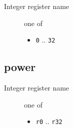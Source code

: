 \documentclass{article}
\begin{document}
\begin{description}
\item[Integer register name]  one of
  \begin{itemize}
  \item \verb|0| .. \verb|32|
  \end{itemize}
\end{description}

\subsection{power}
\begin{description}
\item[Integer register name]  one of
  \begin{itemize}
  \item \verb|r0| .. \verb|r32|
  \end{itemize}
\end{description}
\end{document}
